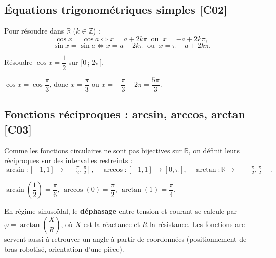 \documentclass[a4paper,11pt]{article}
\begin{document}
\subsection{Équations trigonométriques simples \hfill {\normalsize\color{uimmred}[C02]}}

\begin{theoreme}
Pour résoudre dans $\mathbb{R}$ ($k \in \mathbb{Z}$) :
\[
\cos x = \cos a \iff x = a + 2k\pi \ \text{ ou } \ x = -a + 2k\pi,
\]
\[
\sin x = \sin a \iff x = a + 2k\pi \ \text{ ou } \ x = \pi - a + 2k\pi.
\]
\end{theoreme}

\begin{exemple}
Résoudre $\cos x = \dfrac{1}{2}$ sur $[0\,;\,2\pi[$.

$\cos x = \cos\dfrac{\pi}{3}$, donc $x = \dfrac{\pi}{3}$ ou $x = -\dfrac{\pi}{3} + 2\pi = \dfrac{5\pi}{3}$.
\end{exemple}

\subsection{Fonctions réciproques : arcsin, arccos, arctan \hfill {\normalsize\color{uimmred}[C03]}}

\begin{definition}
Comme les fonctions circulaires ne sont pas bijectives sur $\mathbb{R}$, on définit leurs réciproques sur des intervalles restreints :
\[
\arcsin : [-1,1] \to \left[-\tfrac{\pi}{2}, \tfrac{\pi}{2}\right], \quad
\arccos : [-1,1] \to [0,\pi], \quad
\arctan : \mathbb{R} \to \left]-\tfrac{\pi}{2}, \tfrac{\pi}{2}\right[.
\]
\end{definition}

\begin{exemple}
$\arcsin\!\left(\dfrac{1}{2}\right) = \dfrac{\pi}{6}$, \quad $\arccos(0) = \dfrac{\pi}{2}$, \quad $\arctan(1) = \dfrac{\pi}{4}$.
\end{exemple}

\begin{appliindus}
En régime sinusoïdal, le \textbf{déphasage} entre tension et courant se calcule par $\varphi = \arctan\!\left(\dfrac{X}{R}\right)$, où $X$ est la réactance et $R$ la résistance. Les fonctions arc servent aussi à retrouver un angle à partir de coordonnées (positionnement de bras robotisé, orientation d'une pièce).
\end{appliindus}

\newpage
\end{document}
